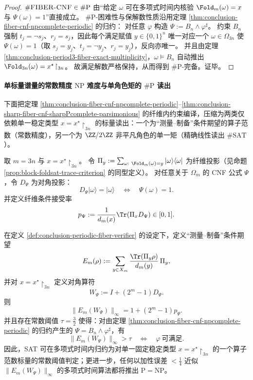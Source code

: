 \begin{proof}
\(\#\textsc{FIBER-CNF}\in\#\mathrm{P}\) 由“给定 \(\omega\) 可在多项式时间内核验 \(\Fold_m(\omega)=x\) 与 \(\Psi(\omega)=1\)”直接成立。
\(\#\mathrm{P}\)-困难性与保解数性质沿用定理 \ref{thm:conclusion-fiber-cnf-npcomplete-periodic} 的归约：
对任意 \(\varphi\) 构造 \(\Psi:=B_n\wedge\varphi^\sharp\)。
约束 \(B_n\) 强制 \(t_j=\neg s_j\)、\(r_j=s_j\)，因此每个满足赋值 \(y\in\{0,1\}^n\) 唯一对应一个 \(\omega\in\Omega_{3n}\) 使 \(\Psi(\omega)=1\)（取 \(s_j=y_j\)、\(t_j=\neg y_j\)、\(r_j=y_j\)），反向亦唯一。
并且由定理 \ref{thm:conclusion-period3-fiber-exact-multiplicity}，\(\omega\models B_n\) 自动推出 \(\Fold_{3n}(\omega)=x^\star\!\upharpoonright_{3n}\)。
故满足解数严格保持，从而得到 \(\#\mathrm{P}\)-完备。证毕。
\end{proof}

\paragraph{单标量谱量的常数精度 \(\mathrm{NP}\) 难度与单角色矩的 \(\#\mathrm{P}\) 读出}
下面把定理 \ref{thm:conclusion-fiber-cnf-npcomplete-periodic}--\ref{thm:conclusion-sharp-fiber-cnf-sharpPcomplete-parsimonious} 的纤维内约束编译，压缩为两类仅依赖单一稳定类型 \(x=x^\star\!\upharpoonright_{3n}\) 的标量读出：一个为“测量--制备”条件期望的算子范数（常数精度），另一个为 \(\ZZ/2\ZZ\) 非平凡角色的单一矩（精确线性读出 \(\#\mathrm{SAT}\)）。

\begin{definition}[固定周期纤维上的验证投影与接受率]\label{def:conclusion-periodic-fiber-verifier}
取 \(m=3n\) 与 \(x=x^\star\!\upharpoonright_{3n}\)。
令 \(\Pi_y:=\sum_{\omega:\ \Fold_m(\omega)=y}|\omega\rangle\langle\omega|\) 为纤维投影（见命题 \ref{prop:block-foldsat-trace-criterion} 的同型定义）。
对任意关于 \(\Omega_m\) 的 CNF 公式 \(\Psi\)，令 \(D_\Psi\) 为对角投影：
\[
D_\Psi|\omega\rangle=|\omega\rangle
\quad\Longleftrightarrow\quad
\Psi(\omega)=1.
\]
并定义纤维条件接受率
\[
p_\Psi:=\frac{1}{d_m(x)}\Tr(\Pi_xD_\Psi)\in[0,1].
\]
\end{definition}

\begin{theorem}[固定周期稳定类型上的常数阈值可满足性判别]\label{thm:conclusion-periodic-fiber-constant-threshold-np-hard}
在定义 \ref{def:conclusion-periodic-fiber-verifier} 的设定下，定义“测量--制备”条件期望
\[
E_m(\rho):=\sum_{y\in X_m}\frac{\Tr(\Pi_y\rho)}{d_m(y)}\,\Pi_y,
\]
并对 \(x=x^\star\!\upharpoonright_{3n}\) 定义对角算符
\[
W_\Psi:=I+(2^{m}-1)D_\Psi.
\]
则
\[
\|E_m(W_\Psi)\|_{\infty}=1+(2^{m}-1)p_\Psi.
\]
并且存在常数阈值 \(\tau=\tfrac32\) 使得：对由定理 \ref{thm:conclusion-fiber-cnf-npcomplete-periodic} 的归约产生的 \(\Psi=B_n\wedge\varphi^\sharp\)，有
\[
\|E_m(W_\Psi)\|_{\infty}>\tau
\quad\Longleftrightarrow\quad
\varphi\ \text{可满足}.
\]
因此，SAT 可在多项式时间内归约为对单一固定稳定类型 \(x=x^\star\!\upharpoonright_{3n}\) 的一个算子范数标量的常数阈值判定；更进一步，任何以加性误差 \(<\tfrac14\) 近似 \(\|E_m(W_\Psi)\|_\infty\) 的多项式时间算法都将推出 \(\mathrm{P}=\mathrm{NP}\)。
\end{theorem}

